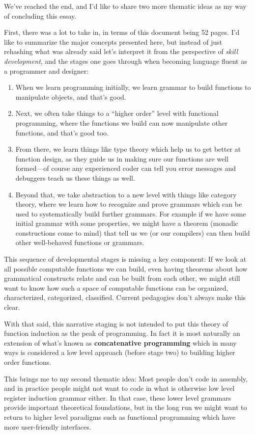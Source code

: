 \documentclass[twoside]{article}
\newcommand{\strong}[1]{{\bfseries #1}}
\begin{document}
We've reached the end, and I'd like to share two more thematic ideas as my way of concluding this essay.

First, there was a lot to take in, in terms of this document being 52 pages. I'd like to summarize the major
concepts presented here, but instead of just rehashing what was already said let's interpret it from the perspective
of \emph{skill development}, and the stages one goes through when becoming language fluent as a programmer and designer:
\begin{enumerate}
\item When we learn programming initially, we learn grammar to build functions to manipulate objects, and that's good.
\item Next, we often take things to a ``higher order'' level with functional programming, where the functions we build
      can now manipulate other functions, and that's good too.
\item From there, we learn things like type theory which help us to get better at function design, as they guide us
      in making sure our functions are well formed---of course any experienced coder can tell you error messages
      and debuggers teach us these things as well.
\item Beyond that, we take abstraction to a new level with things like category theory, where we learn how to recognize
      and prove grammars which can be used to systematically build further grammars. For example if we have some initial
      grammar with some properties, we might have a theorem (monadic constructions come to mind) that tell us
      we (or our compilers) can then build other well-behaved functions or grammars.
\end{enumerate}
This sequence of developmental stages is missing a key component: If we look at all possible computable functions we can
build, even having theorems about how grammatical constructs relate and can be built from each other, we might still want
to know how such a space of computable functions can be organized, characterized, categorized, classified. Current
pedagogies don't always make this clear.

With that said, this narrative staging is not intended to put this theory of function induction as the peak of programming.
In fact it is most naturally an extension of what's known as \strong{concatenative programming} which in many ways is
considered a low level approach (before stage two) to building higher order functions.

This brings me to my second thematic idea: Most people don't code in assembly, and in practice people might not want to
code in what is otherwise low level register induction grammar either. In that case, these lower level grammars provide
important theoretical foundations, but in the long run we might want to return to higher level paradigms such as functional
programming which have more user-friendly interfaces.
\end{document}
